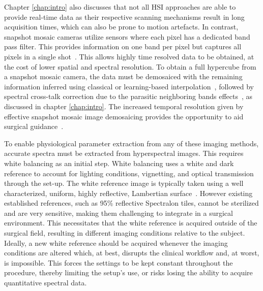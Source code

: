 Chapter \ref{chap:intro} also discusses that not all HSI approaches are able to provide real-time data as their respective scanning mechanisms result in long acquisition times, which can also be prone to motion artefacts. In contrast, snapshot mosaic cameras utilize sensors where each pixel has a dedicated band pass filter. This provides information on one band per pixel but captures all pixels in a single shot~\citep{Geelen2014}. This allows highly time resolved data to be obtained, at the cost of lower spatial and spectral resolution. To obtain a full hypercube from a snapshot mosaic camera, the data must be demosaiced with the remaining information inferred using classical or learning-based interpolation~\citep{Li2021}, followed by spectral cross-talk correction due to the parasitic neighboring bands effects~\citep{Pichette2017}, as discussed in chapter \ref{chap:intro}. The increased temporal resolution given by effective snapshot mosaic image demosaicing provides the opportunity to aid surgical guidance~\citep{Ayala2021, Ebner2021}.

To enable physiological parameter extraction from any of these imaging methods, accurate spectra must be extracted from hyperspectral images. This requires white balancing as an initial step. White balancing uses a white and dark reference to account for lighting conditions, vignetting, and optical transmission through the set-up.
The white reference image is typically taken using a well characterized, uniform, highly reflective, Lambertian surface~\citep{Lu2014}.
However existing established references, such as 95\% reflective Spectralon tiles, cannot be sterilized and are very sensitive, making them challenging to integrate in a surgical environment.
This necessitates that the white reference is acquired outside 
%
of the surgical field, resulting in different imaging conditions relative to the subject.
Ideally, a new white reference should be acquired whenever the imaging conditions are altered which, at best, disrupts the clinical workflow and, at worst, is impossible. This forces the settings to be kept constant throughout the procedure, thereby limiting the setup's use, or risks losing the ability to acquire quantitative spectral data. 

